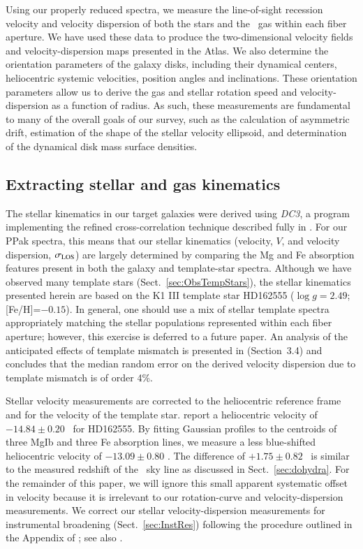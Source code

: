 \documentclass[traditabstract]{aa} %
\begin{document}
Using our properly reduced spectra, we measure the line-of-sight recession
velocity and velocity dispersion of both the stars and the \oiii\ gas within each
fiber aperture. We have used these data to produce the two-dimensional velocity
fields and velocity-dispersion maps presented in the Atlas.  We also determine
the orientation parameters of the galaxy disks, including their dynamical
centers, heliocentric systemic velocities, position angles and inclinations.
These orientation parameters allow us to derive the gas and stellar rotation
speed and velocity-dispersion as a function of radius.  As such, these
measurements are fundamental to many of the overall goals of our survey, such as
the calculation of asymmetric drift, estimation of the shape of the stellar
velocity ellipsoid, and determination of the dynamical disk mass surface
densities.


\subsection{Extracting stellar and gas kinematics}
\label{sec:extractkin}

The stellar kinematics in our target galaxies were derived using \textit{DC3}, a
program implementing the refined cross-correlation technique described fully in
.  For our PPak spectra, this means that our stellar
kinematics (velocity, $V$, and velocity dispersion, $\sigma_{\rm LOS}$) are largely
determined by comparing the Mg and Fe absorption features present in both the
galaxy and template-star spectra.  Although we have observed many template stars
(Sect.~\ref{sec:ObsTempStars}), the stellar kinematics presented herein are
based on the K1 III template star HD162555 ($\log g=2.49$; [Fe/H]=$-0.15$).
In general, one should use a mix of stellar template spectra appropriately
matching the stellar populations represented within each fiber aperture;
however, this exercise is deferred to a future paper.  An analysis of the
anticipated effects of template mismatch is presented in
 (Section~3.4) and concludes that the median random
error on the derived velocity dispersion due to template mismatch is of order
4\%.

Stellar velocity measurements are corrected to the heliocentric reference frame
and for the velocity of the template star.  \citet{famaey2005} report a
heliocentric velocity of $-14.84 \pm 0.20$ \kms\ for HD162555.  By fitting
Gaussian profiles to the centroids of three MgIb and three Fe absorption lines,
we measure a less blue-shifted heliocentric velocity of $-13.09 \pm 0.80$ \kms.
The difference of $+1.75 \pm 0.82$ \kms\ is similar to the measured redshift of
the \none\ sky line as discussed in Sect.~\ref{sec:dohydra}.  For the
remainder of this paper, we will ignore this small apparent systematic offset in
velocity because it is irrelevant to our rotation-curve and velocity-dispersion
measurements.  We correct our stellar velocity-dispersion measurements for
instrumental broadening (Sect.~\ref{sec:InstRes}) following the procedure
outlined in the Appendix of ; see also
.
\end{document}

